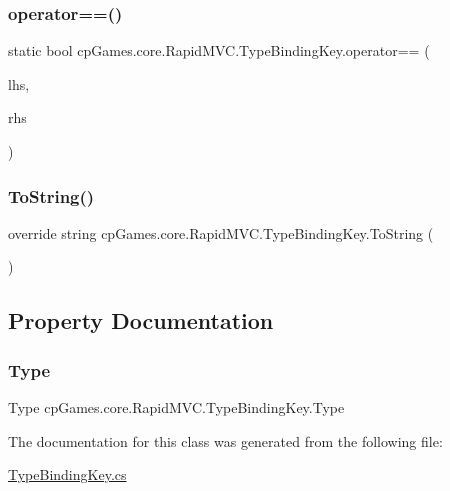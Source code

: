 \subsubsection{\texorpdfstring{operator==()}{operator==()}}
{\footnotesize\ttfamily static bool cp\+Games.\+core.\+Rapid\+M\+V\+C.\+Type\+Binding\+Key.\+operator== (\begin{DoxyParamCaption}\item[{\mbox{\hyperlink{classcp_games_1_1core_1_1_rapid_m_v_c_1_1_type_binding_key}{Type\+Binding\+Key}}}]{lhs,  }\item[{\mbox{\hyperlink{interfacecp_games_1_1core_1_1_rapid_m_v_c_1_1_i_binding_key}{I\+Binding\+Key}}}]{rhs }\end{DoxyParamCaption})\hspace{0.3cm}{\ttfamily [static]}}

\mbox{\label{classcp_games_1_1core_1_1_rapid_m_v_c_1_1_type_binding_key_a4f28fb3ba3a6236fe700e2f65e1d7e33}} 
\subsubsection{\texorpdfstring{ToString()}{ToString()}}
{\footnotesize\ttfamily override string cp\+Games.\+core.\+Rapid\+M\+V\+C.\+Type\+Binding\+Key.\+To\+String (\begin{DoxyParamCaption}{ }\end{DoxyParamCaption})}



\subsection{Property Documentation}
\mbox{\label{classcp_games_1_1core_1_1_rapid_m_v_c_1_1_type_binding_key_a2607ca6b5f825138867c84fb68fb159e}} 
\subsubsection{\texorpdfstring{Type}{Type}}
{\footnotesize\ttfamily Type cp\+Games.\+core.\+Rapid\+M\+V\+C.\+Type\+Binding\+Key.\+Type\hspace{0.3cm}{\ttfamily [get]}}



The documentation for this class was generated from the following file\+:\begin{DoxyCompactItemize}
\item 
\mbox{\hyperlink{_type_binding_key_8cs}{Type\+Binding\+Key.\+cs}}\end{DoxyCompactItemize}

